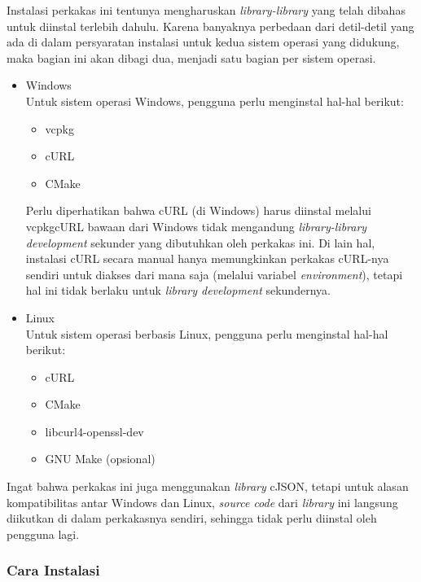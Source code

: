 Instalasi perkakas ini tentunya mengharuskan \textit{library-library} yang telah dibahas untuk diinstal terlebih dahulu. Karena banyaknya perbedaan dari detil-detil yang ada di dalam persyaratan instalasi untuk kedua sistem operasi yang didukung, maka bagian ini akan dibagi dua, menjadi satu bagian per sistem operasi.

\begin{itemize}
	\item Windows \\
	Untuk sistem operasi Windows, pengguna perlu menginstal hal-hal berikut:
	
	\begin{itemize}
		\item vcpkg
		\item cURL
		\item CMake
	\end{itemize}
	
	Perlu diperhatikan bahwa cURL (di Windows) harus diinstal melalui vcpkg\textemdash cURL bawaan dari Windows tidak mengandung \textit{library-library development} sekunder yang dibutuhkan oleh perkakas ini. Di lain hal, instalasi cURL secara manual hanya memungkinkan perkakas cURL-nya sendiri untuk diakses dari mana saja (melalui variabel \textit{environment}), tetapi hal ini tidak berlaku untuk \textit{library development} sekundernya.
	
	\item Linux \\
	Untuk sistem operasi berbasis Linux, pengguna perlu menginstal hal-hal berikut:
	
	\begin{itemize}
		\item cURL
		\item CMake
		\item libcurl4-openssl-dev
		\item GNU Make (opsional)
	\end{itemize}
	
\end{itemize}
\noindent
Ingat bahwa perkakas ini juga menggunakan \textit{library} cJSON, tetapi untuk alasan kompatibilitas antar Windows dan Linux, \textit{source code} dari \textit{library} ini langsung diikutkan di dalam perkakasnya sendiri, sehingga tidak perlu diinstal oleh pengguna lagi.

\subsubsection{Cara Instalasi}
\label{sec:testing-implementation-installation-howto}

